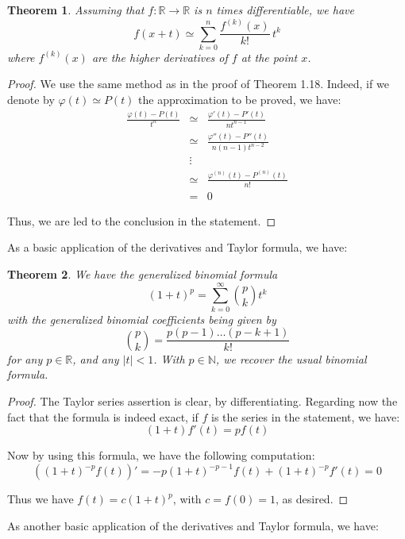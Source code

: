 \documentclass[12pt]{amsbook}
\newtheorem{theorem}{Theorem}[chapter]
\begin{document}

\begin{theorem}
Assuming that $f:\mathbb R\to\mathbb R$ is $n$ times differentiable, we have
$$f(x+t)\simeq\sum_{k=0}^n\frac{f^{(k)}(x)}{k!}\,t^k$$
where $f^{(k)}(x)$ are the higher derivatives of $f$ at the point $x$.
\end{theorem}

\begin{proof}
We use the same method as in the proof of Theorem 1.18. Indeed, if we denote by $\varphi(t)\simeq P(t)$ the approximation to be proved, we have:
\begin{eqnarray*}
\frac{\varphi(t)-P(t)}{t^n}
&\simeq&\frac{\varphi'(t)-P'(t)}{nt^{n-1}}\\
&\simeq&\frac{\varphi''(t)-P''(t)}{n(n-1)t^{n-2}}\\
&\vdots&\\
&\simeq&\frac{\varphi^{(n)}(t)-P^{(n)}(t)}{n!}\\
&=&0
\end{eqnarray*}

Thus, we are led to the conclusion in the statement.
\end{proof}

As a basic application of the derivatives and Taylor formula, we have:


\begin{theorem}
We have the generalized binomial formula
$$(1+t)^p=\sum_{k=0}^\infty\binom{p}{k}t^k$$
with the generalized binomial coefficients being given by
$$\binom{p}{k}=\frac{p(p-1)\ldots(p-k+1)}{k!}$$
for any $p\in\mathbb R$, and any $|t|<1$. With $p\in\mathbb N$, we recover the usual binomial formula.
\end{theorem}

\begin{proof}
The Taylor series assertion is clear, by differentiating. Regarding now the fact that the formula is indeed exact, if $f$ is the series in the statement, we have:
$$(1+t)f'(t)=pf(t)$$

Now by using this formula, we have the following computation:
$$\left((1+t)^{-p}f(t)\right)'=-p(1+t)^{-p-1}f(t)+(1+t)^{-p}f'(t)=0$$

Thus we have $f(t)=c(1+t)^p$, with $c=f(0)=1$, as desired.
\end{proof}

As another basic application of the derivatives and Taylor formula, we have:
\end{document}
